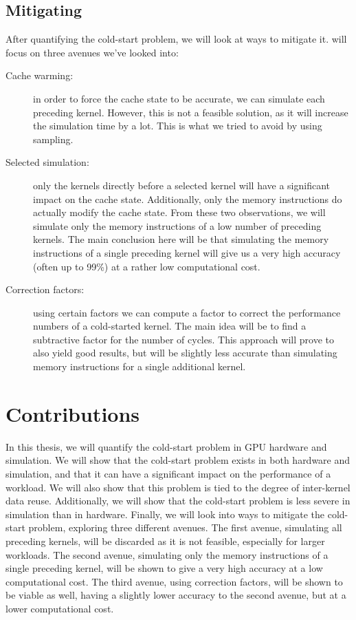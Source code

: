 \subsection{Mitigating}\label{subsec:mitigating}
After quantifying the cold-start problem, we will look at ways to mitigate it.
 will focus on three avenues we've looked into:
\begin{description}
    \item[Cache warming:] in order to force the cache state to be accurate, we can simulate each preceding kernel.
    However, this is not a feasible solution, as it will increase the simulation time by a lot.
    This is what we tried to avoid by using sampling.
    \item[Selected simulation:] only the kernels directly before a selected kernel will have a significant impact on the cache state.
    Additionally, only the memory instructions do actually modify the cache state.
    From these two observations, we will simulate only the memory instructions of a low number of preceding kernels.
    The main conclusion here will be that simulating the memory instructions of a single preceding kernel will give us a very high accuracy (often up to 99\%) at a rather low computational cost.
    \item[Correction factors:] using certain factors we can compute a factor to correct the performance numbers of a cold-started kernel.
    The main idea will be to find a subtractive factor for the number of cycles.
    This approach will prove to also yield good results, but will be slightly less accurate than simulating memory instructions for a single additional kernel.
\end{description}

\section{Contributions}\label{sec:contrib}
In this thesis, we will quantify the cold-start problem in GPU hardware and simulation.
We will show that the cold-start problem exists in both hardware and simulation, and that it can have a significant impact on the performance of a workload.
We will also show that this problem is tied to the degree of inter-kernel data reuse.
Additionally, we will show that the cold-start problem is less severe in simulation than in hardware.
Finally, we will look into ways to mitigate the cold-start problem, exploring three different avenues.
The first avenue, simulating all preceding kernels, will be discarded as it is not feasible, especially for larger workloads.
The second avenue, simulating only the memory instructions of a single preceding kernel, will be shown to give a very high accuracy at a low computational cost.
The third avenue, using correction factors, will be shown to be viable as well, having a slightly lower accuracy to the second avenue, but at a lower computational cost.